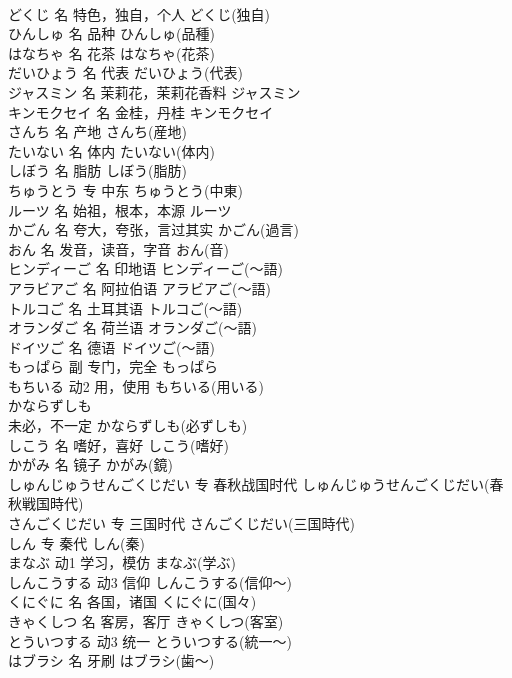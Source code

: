 \documentclass[8pt]{extreport}
\begin{document}
\begin{CJK}{UTF8}{min}
\\	どくじ	名	特色，独自，个人	どくじ(独自)	
\\	ひんしゅ	名	品种	ひんしゅ(品種)	
\\	はなちゃ	名	花茶	はなちゃ(花茶)	
\\	だいひょう	名	代表	だいひょう(代表)	
\\	ジャスミン	名	茉莉花，茉莉花香料	ジャスミン	
\\	キンモクセイ	名	金桂，丹桂	キンモクセイ	
\\	さんち	名	产地	さんち(産地)	
\\	たいない	名	体内	たいない(体内)	
\\	しぼう	名	脂肪	しぼう(脂肪)	
\\	ちゅうとう	专	中东	ちゅうとう(中東)	
\\	ルーツ	名	始祖，根本，本源	ルーツ	
\\	かごん	名	夸大，夸张，言过其实	かごん(過言)	
\\	おん	名	发音，读音，字音	おん(音)	
\\	ヒンディーご	名	印地语	ヒンディーご(～語)	
\\	アラビアご	名	阿拉伯语	アラビアご(～語)	
\\	トルコご	名	土耳其语	トルコご(～語)	
\\	オランダご	名	荷兰语	オランダご(～語)	
\\	ドイツご	名	德语	ドイツご(～語)	
\\	もっぱら	副	专门，完全	もっぱら	
\\	もちいる	动2	用，使用	もちいる(用いる)	
\\	かならずしも	
\\	未必，不一定	かならずしも(必ずしも)	
\\	しこう	名	嗜好，喜好	しこう(嗜好)	
\\	かがみ	名	镜子	かがみ(鏡)	
\\	しゅんじゅうせんごくじだい	专	春秋战国时代	しゅんじゅうせんごくじだい(春秋戦国時代)	
\\	さんごくじだい	专	三国时代	さんごくじだい(三国時代)	
\\	しん	专	秦代	しん(秦)	
\\	まなぶ	动1	学习，模仿	まなぶ(学ぶ)	
\\	しんこうする	动3	信仰	しんこうする(信仰～)	
\\	くにぐに	名	各国，诸国	くにぐに(国々)	
\\	きゃくしつ	名	客房，客厅	きゃくしつ(客室)	
\\	とういつする	动3	统一	とういつする(統一～)	
\\	はブラシ	名	牙刷	はブラシ(歯～)	

\end{CJK}
\end{document}
